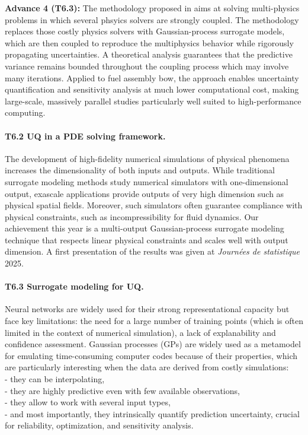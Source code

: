 \textbf{Advance 4 (T6.3):} The methodology proposed in \cite{abboud2026} aims at solving multi-physics problems in which several phsyics solvers are strongly coupled. The methodology replaces those costly physics solvers with Gaussian-process surrogate models, which are then coupled to reproduce the multiphysics behavior while rigorously propagating uncertainties. A theoretical analysis guarantees that the predictive variance remains bounded throughout the coupling process which may involve many iterations. Applied to fuel assembly bow, the approach enables uncertainty quantification and sensitivity analysis at much lower computational cost, making large-scale, massively parallel studies particularly well suited to high-performance computing.


\paragraph{T6.2 UQ in a PDE solving framework.}
The development of high-fidelity numerical simulations of physical phenomena increases the dimensionality of both inputs and outputs. While traditional surrogate modeling methods study numerical simulators with one-dimensional output, exascale applications provide outputs of very high dimension such as physical spatial fields. Moreover, such simulators often guarantee compliance with physical constraints, such as incompressibility for fluid dynamics. Our achievement this year is a multi-output Gaussian-process surrogate modeling technique that respects linear physical constraints and scales well with output dimension. A first presentation of the results was given at \textit{Journées de statistique} 2025.


\paragraph{T6.3 Surrogate modeling for UQ.}
Neural networks are widely used for their strong representational capacity but face key limitations: the need for a large number of training points (which is often limited in the context of numerical simulation), a lack of explanability and confidence assessment.
Gaussian processes (GPs) are widely used as a metamodel for emulating time-consuming computer codes because of  their properties, which are particularly interesting when the data are derived from costly simulations:\\
- they can be interpolating,\\
- they are highly predictive even with few available observations,\\
- they allow to work with several input types,\\
- and most importantly, they intrinsically quantify prediction uncertainty, crucial for reliability, optimization, and sensitivity analysis.

